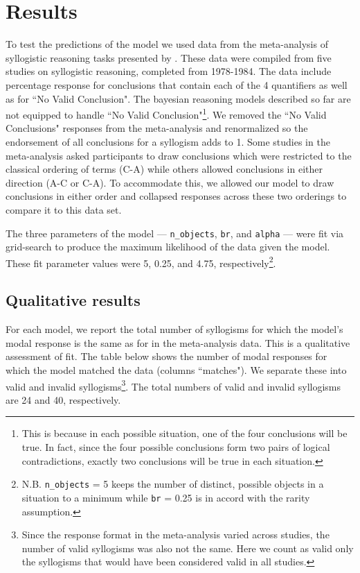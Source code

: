 \documentclass[10pt,letterpaper]{article}
\begin{document}
\section{Results}

To test the predictions of the model we used data from the meta-analysis of syllogistic reasoning tasks presented by . These data were compiled from five studies on syllogistic reasoning, completed from 1978-1984. The data include percentage response for conclusions that contain each of the 4 quantifiers as well as for ``No Valid Conclusion". The bayesian reasoning models described so far are not equipped to handle ``No Valid Conclusion"\footnote{This is because in each possible situation, one of the four conclusions will be true. In fact, since the four possible conclusions form two pairs of logical contradictions, exactly two conclusions will be true in each situation.}. We removed the ``No Valid Conclusions" responses from the meta-analysis and renormalized so the endorsement of all conclusions for a syllogism adds to 1. Some studies in the meta-analysis asked participants to draw conclusions which were restricted to the classical ordering of terms (C-A) while others allowed conclusions in either direction (A-C or C-A). To accommodate this, we allowed our model to draw conclusions in either order and collapsed responses across these two orderings to compare it to this data set.
%

The three parameters of the model --- \lstinline{n_objects}, \lstinline{br}, and \lstinline{alpha} --- were fit via grid-search to produce the maximum likelihood of the data given the model. These fit parameter values were 5, 0.25, and 4.75, respectively\footnote{N.B. \lstinline{n_objects} = 5 keeps the number of distinct, possible objects in a situation to a minimum while \lstinline{br} = 0.25 is in accord with the rarity assumption.}.

\subsection{Qualitative results}
For each model, we report the total number of syllogisms for which the model's modal response is the same as for in the meta-analysis data. This is a qualitative assessment of fit. The table below shows the number of modal responses for which the model matched the data (columns ``matches"). We separate these into valid and invalid syllogisms\footnote{Since the response format in the meta-analysis varied across studies, the number of valid syllogisms was also not the same. Here we count as valid only the syllogisms that would have been considered valid in all studies.}. The total numbers of valid and invalid syllogisms are 24 and 40, respectively. 
\end{document}
